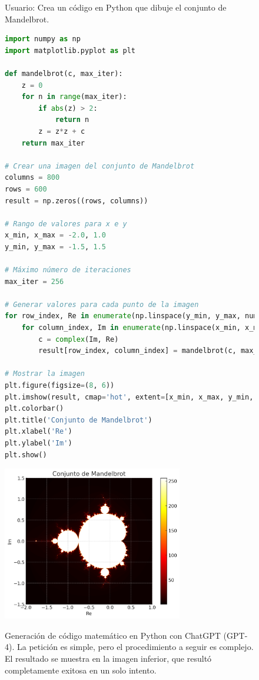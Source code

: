 \begin{figure}%
    \caption[Generación de código matemático en Python con ChatGPT (GPT-4)]{Generación de código matemático en Python con ChatGPT (GPT-4). La petición es simple, pero el procedimiento a seguir es complejo. El resultado se muestra en la imagen inferior, que resultó completamente exitosa en un solo intento.}
      \centering
      \begin{mdframed}
        \fontsize{9.5pt}{11pt}\selectfont
        Usuario: Crea un código en Python que dibuje el conjunto de Mandelbrot.
      \end{mdframed}
        \centering
        \begin{mdframed}
          \fontsize{9.5pt}{11pt}\selectfont
        \begin{lstlisting}[language=Python, basicstyle=\footnotesize\ttfamily, keywordstyle=\color{blue}, commentstyle=\color{green}, stringstyle=\color{red},
        numbers=none]
import numpy as np
import matplotlib.pyplot as plt

def mandelbrot(c, max_iter):
    z = 0
    for n in range(max_iter):
        if abs(z) > 2:
            return n
        z = z*z + c
    return max_iter

# Crear una imagen del conjunto de Mandelbrot
columns = 800
rows = 600
result = np.zeros((rows, columns))

# Rango de valores para x e y
x_min, x_max = -2.0, 1.0
y_min, y_max = -1.5, 1.5

# Máximo número de iteraciones
max_iter = 256

# Generar valores para cada punto de la imagen
for row_index, Re in enumerate(np.linspace(y_min, y_max, num=rows)):
    for column_index, Im in enumerate(np.linspace(x_min, x_max, num=columns)):
        c = complex(Im, Re)
        result[row_index, column_index] = mandelbrot(c, max_iter)

# Mostrar la imagen
plt.figure(figsize=(8, 6))
plt.imshow(result, cmap='hot', extent=[x_min, x_max, y_min, y_max])
plt.colorbar()
plt.title('Conjunto de Mandelbrot')
plt.xlabel('Re')
plt.ylabel('Im')
plt.show()              
        \end{lstlisting}
      \end{mdframed}
        \includegraphics[width=0.7\textwidth]{./figuras/python_mandelbrot.png}
    \source{\propio}
    \label{fig:python_mandelbrot}
\end{figure}


